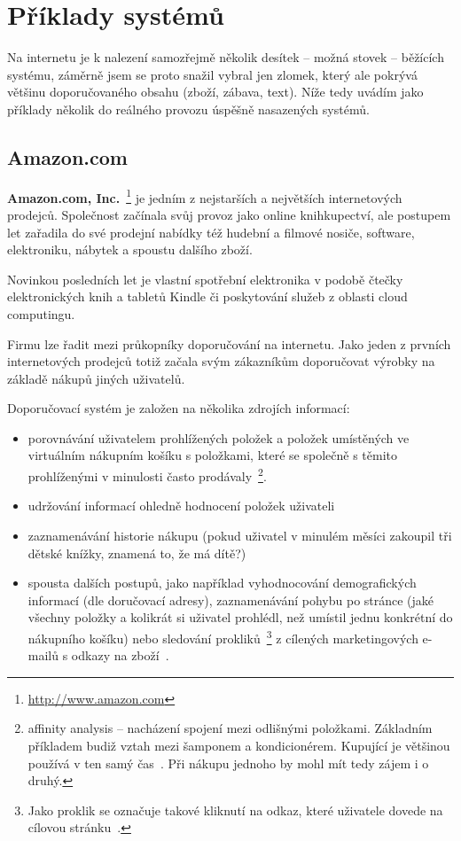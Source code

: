 \documentclass[thesis=M,czech]{FITthesis}[2014/05/07]
\begin{document}
\section{Příklady systémů}
\label{sec:examples}
Na internetu je k nalezení samozřejmě několik desítek – možná stovek – běžících systému, záměrně jsem se proto snažil vybral jen zlomek, který ale pokrývá většinu doporučovaného obsahu (zboží, zábava, text). Níže tedy uvádím jako příklady několik do reálného provozu úspěšně nasazených systémů. 

\subsection{Amazon.com}

\textbf{Amazon.com, Inc.}~\footnote{\url{http://www.amazon.com}} je jedním z nejstarších a největších internetových prodejců. Společnost začínala svůj provoz jako online knihkupectví, ale postupem let zařadila do své prodejní nabídky též hudební a filmové nosiče, software, elektroniku, nábytek a spoustu dalšího zboží.

Novinkou posledních let je vlastní spotřební elektronika v podobě čtečky elektronických knih a tabletů Kindle či poskytování služeb z oblasti cloud computingu.

Firmu lze řadit mezi průkopníky doporučování na internetu. Jako jeden z prvních internetových prodejců totiž začala svým zákazníkům doporučovat výrobky na základě nákupů jiných uživatelů.

Doporučovací systém je založen na několika zdrojích informací:

\begin{itemize}
	\item porovnávání uživatelem prohlížených položek a položek umístěných ve virtuálním nákupním košíku s položkami, které se společně s těmito prohlíženými v minulosti často prodávaly~\footnote{affinity analysis – nacházení spojení mezi odlišnými položkami. Základním příkladem budiž vztah mezi šamponem a kondicionérem. Kupující je většinou používá v ten samý čas~\cite{affinity}. Při nákupu jednoho by mohl mít tedy zájem i o druhý.}.
	\item udržování informací ohledně hodnocení položek uživateli
	\item zaznamenávání historie nákupu (pokud uživatel v minulém měsíci zakoupil tři dětské knížky, znamená to, že má dítě?)
	\item spousta dalších postupů, jako například vyhodnocování demografických informací (dle doručovací adresy), zaznamenávání pohybu po stránce (jaké všechny položky a kolikrát si uživatel prohlédl, než umístil jednu konkrétní do nákupního košíku) nebo sledování prokliků~\footnote{Jako proklik se označuje takové kliknutí na odkaz, které uživatele dovede na cílovou stránku~\cite{proklik}.} z cílených marketingových e-mailů s odkazy na zboží~\cite{amazonrec}.
\end{itemize}
\end{document}
